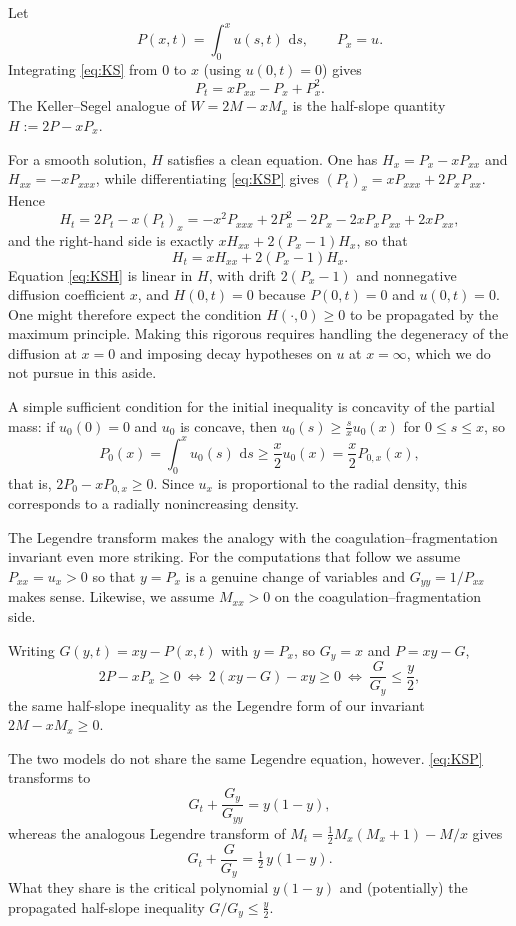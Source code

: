 \documentclass[12pt]{amsart}
\numberwithin{equation}{section}
\theoremstyle{plain}
\theoremstyle{definition}
\newcommand{\dd}{\,\mathrm{d}}
\begin{document}
Let
\[
	P(x,t)=\int_0^x u(s,t)\,\dd s ,\qquad P_x=u .
\]
Integrating \eqref{eq:KS} from $0$ to $x$ (using $u(0,t)=0$) gives
\begin{equation}\label{eq:KSP}
	P_t=xP_{xx}-P_x+P_x^2 .
\end{equation}
The Keller--Segel analogue of $W=2M-xM_x$ is the half-slope
quantity $H:=2P-xP_x$.

For a smooth solution, $H$ satisfies a clean equation. One has
$H_x=P_x-xP_{xx}$ and $H_{xx}=-xP_{xxx}$, while differentiating
\eqref{eq:KSP} gives $(P_t)_x=xP_{xxx}+2P_xP_{xx}$. Hence
\[
	H_t=2P_t-x(P_t)_x
	=-x^2P_{xxx}+2P_x^2-2P_x-2xP_xP_{xx}+2xP_{xx},
\]
and the right-hand side is exactly $xH_{xx}+2(P_x-1)H_x$, so that
\begin{equation}\label{eq:KSH}
	H_t=xH_{xx}+2(P_x-1)H_x .
\end{equation}
Equation \eqref{eq:KSH} is linear in $H$, with drift $2(P_x-1)$ and
nonnegative diffusion coefficient $x$, and $H(0,t)=0$ because $P(0,t)=0$ and
$u(0,t)=0$. One might therefore expect the condition $H(\cdot,0)\ge0$ to be
propagated by the maximum principle. Making this rigorous requires handling
the degeneracy of the diffusion at $x=0$ and imposing decay hypotheses on $u$
at $x=\infty$, which we do not pursue in this aside.

A simple sufficient condition for the initial inequality is concavity of the
partial mass: if $u_0(0)=0$ and $u_0$ is concave, then
$u_0(s)\ge\frac{s}{x}u_0(x)$ for $0\le s\le x$, so
\[
	P_0(x)=\int_0^x u_0(s)\,\dd s\ge\frac{x}{2}u_0(x)=\frac{x}{2}P_{0,x}(x),
\]
that is, $2P_0-xP_{0,x}\ge0$. Since $u_x$ is proportional to the radial density,
this corresponds to a radially nonincreasing density.

The Legendre transform makes the analogy with the coagulation--fragmentation
invariant even more striking. For the computations that follow we assume
$P_{xx}=u_x>0$ so that $y=P_x$
is a genuine change of variables and $G_{yy}=1/P_{xx}$ makes sense.
Likewise, we assume $M_{xx}>0$ on the coagulation--fragmentation side.

Writing $G(y,t)=xy-P(x,t)$ with $y=P_x$, so $G_y=x$ and
$P=xy-G$,
\begin{equation}\label{eq:KShalf}
	2P-xP_x\ge0
	\ \Longleftrightarrow\
	2(xy-G)-xy\ge0
	\ \Longleftrightarrow\
	\frac{G}{G_y}\le\frac{y}{2},
\end{equation}
the same half-slope inequality as the Legendre form of our invariant
$2M-xM_x\ge0$.

The two models do not share the same Legendre
equation, however.
\eqref{eq:KSP} transforms to
\begin{equation}\label{eq:KSleg}
	G_t+\frac{G_y}{G_{yy}}=y(1-y),
\end{equation}
whereas the analogous Legendre transform of $M_t=\tfrac12 M_x(M_x+1)-M/x$ gives
\begin{equation}\label{eq:CFleg}
	G_t+\frac{G}{G_y}=\tfrac12\,y(1-y).
\end{equation}
What they share is the critical polynomial $y(1-y)$ and (potentially) the
propagated half-slope
inequality $G/G_y\le\tfrac{y}{2}$.
\end{document}
